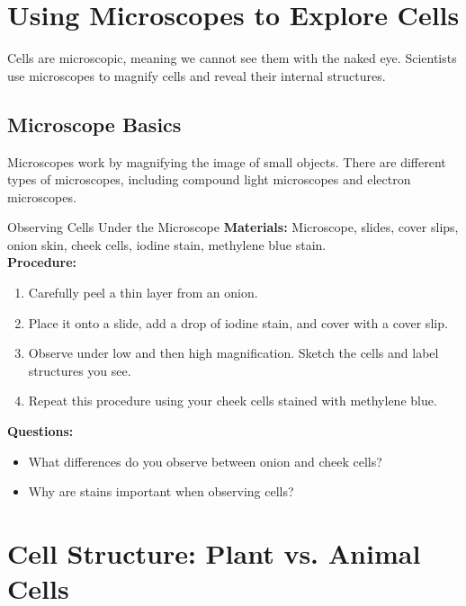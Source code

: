 \section{Using Microscopes to Explore Cells}

Cells are microscopic, meaning we cannot see them with the naked eye. Scientists use microscopes to magnify cells and reveal their internal structures.

\subsection{Microscope Basics}

Microscopes work by magnifying the image of small objects. There are different types of microscopes, including compound light microscopes and electron microscopes.

\begin{marginfigure}
\caption{Parts of a compound microscope.}
\end{marginfigure}

\begin{investigation}{Observing Cells Under the Microscope}
\textbf{Materials:} Microscope, slides, cover slips, onion skin, cheek cells, iodine stain, methylene blue stain.\\
\textbf{Procedure:}
\begin{enumerate}
    \item Carefully peel a thin layer from an onion.
    \item Place it onto a slide, add a drop of iodine stain, and cover with a cover slip.
    \item Observe under low and then high magnification. Sketch the cells and label structures you see.
    \item Repeat this procedure using your cheek cells stained with methylene blue.
\end{enumerate}
\textbf{Questions:}
\begin{itemize}
    \item What differences do you observe between onion and cheek cells?
    \item Why are stains important when observing cells?
\end{itemize}
\end{investigation}

\section{Cell Structure: Plant vs. Animal Cells}

